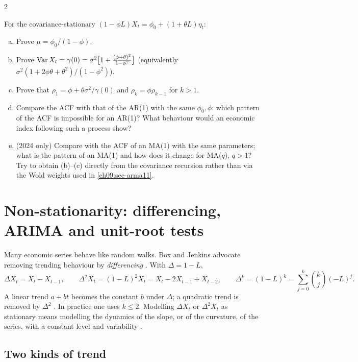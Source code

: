 \begin{paracol}{2}
\begin{exercise}\label{ch09:ex-arma11}
For the covariance-stationary $(1-\phi L)X_t=\phi_0+(1+\theta L)\eta_t$:
\begin{enumerate}[(a)]
  \item Prove $\mu=\phi_0/(1-\phi)$.
  \item Prove $\operatorname{Var} X_t=\gamma(0)=\sigma^2\bigl[1+\frac{(\phi+\theta)^2}{1-\phi^2}\bigr]$
      (equivalently $\sigma^2(1+2\phi\theta+\theta^2)/(1-\phi^2)$).
  \item Prove that $\rho_1=\phi+\theta\sigma^2/\gamma(0)$ and $\rho_k=\phi\rho_{k-1}$ for $k>1$.
  \item Compare the ACF with that of the AR(1) with the same $\phi_0,\phi$: which pattern of the ACF is impossible for an AR(1)?
      What behaviour would an economic index following such a process show?
  \item (2024 only) Compare with the ACF of an MA(1) with the same parameters; what is the pattern of an MA(1) and how does it change for MA($q$), $q>1$?
      Try to obtain (b)--(c) directly from the covariance recursion rather than via the Wold weights used in \cref{ch09:sec-arma11}.
\end{enumerate}
\end{exercise}

\section{Non-stationarity: differencing, ARIMA and unit-root tests}\label{ch09:sec-nonstat}

Many economic series behave like random walks. Box and Jenkins advocate removing trending behaviour by
\emph{differencing} . With $\Delta=1-L$,
\[
  \Delta X_t=X_t-X_{t-1},\qquad
  \Delta^2X_t=(1-L)^2X_t=X_t-2X_{t-1}+X_{t-2},\qquad
  \Delta^k=(1-L)^k=\sum_{j=0}^k\binom kj(-L)^j .
\]
A linear trend $a+bt$ becomes the constant $b$ under $\Delta$; a quadratic trend is removed by $\Delta^2$
. In practice one uses $k\le2$. Modelling $\Delta X_t$ or $\Delta^2X_t$ as stationary
means modelling the dynamics of the slope, or of the curvature, of the series, with a constant level and variability
.

\subsection{Two kinds of trend}\label{ch09:sec-trends}

\end{paracol}
